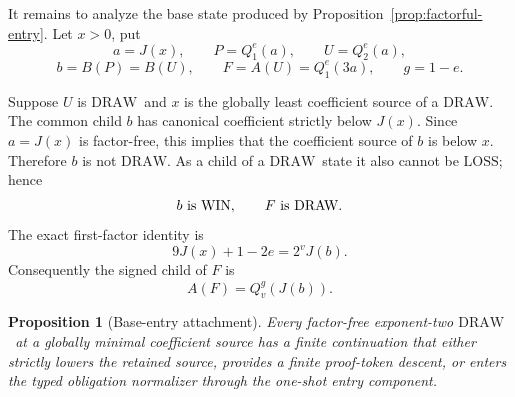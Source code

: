 \documentclass[11pt]{article}
\newtheorem{proposition}[theorem]{Proposition}
\newcommand{\WIN}{\ensuremath{\mathrm{WIN}}}
\newcommand{\LOSS}{\ensuremath{\mathrm{LOSS}}}
\newcommand{\DRAW}{\ensuremath{\mathrm{DRAW}}}
\begin{document}
It remains to analyze the base state produced by
Proposition~\ref{prop:factorful-entry}. Let $x>0$, put
\[
  a=J(x),\qquad P=Q_1^e(a),\qquad U=Q_2^e(a),
\]
\[
  b=B(P)=B(U),\qquad F=A(U)=Q_1^e(3a),\qquad g=1-e.
\]

Suppose $U$ is \DRAW\ and $x$ is the globally least coefficient source of a
\DRAW. The common child $b$ has canonical coefficient strictly below $J(x)$.
Since $a=J(x)$ is factor-free, this implies that the coefficient source of $b$
is below $x$. Therefore $b$ is not \DRAW. As a child of a \DRAW\ state it also
cannot be \LOSS; hence
\[
  b\text{ is \WIN},\qquad F\text{ is \DRAW}.
\]
The exact first-factor identity is
\[
  \boxed{9J(x)+1-2e=2^vJ(b)}. \tag{1}
\]
Consequently the signed child of $F$ is
\[
  A(F)=Q_v^g(J(b)).
\]

\begin{proposition}[Base-entry attachment]\label{prop:base-entry}
Every factor-free exponent-two \DRAW\ at a globally minimal coefficient source
has a finite continuation that either strictly lowers the retained source,
provides a finite proof-token descent, or enters the typed obligation
normalizer through the one-shot entry component.
\end{proposition}
\end{document}
